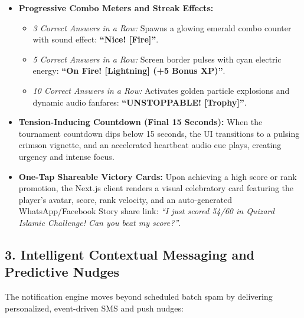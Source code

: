 \begin{itemize}
    \item \textbf{Progressive Combo Meters and Streak Effects:}
    \begin{itemize}
        \item \textit{3 Correct Answers in a Row:} Spawns a glowing emerald combo counter with sound effect: \textbf{``Nice! [Fire]''}.
        \item \textit{5 Correct Answers in a Row:} Screen border pulses with cyan electric energy: \textbf{``On Fire! [Lightning] (+5 Bonus XP)''}.
        \item \textit{10 Correct Answers in a Row:} Activates golden particle explosions and dynamic audio fanfares: \textbf{``UNSTOPPABLE! [Trophy]''}.
    \end{itemize}
    \item \textbf{Tension-Inducing Countdown (Final 15 Seconds):} When the tournament countdown dips below 15 seconds, the UI transitions to a pulsing crimson vignette, and an accelerated heartbeat audio cue plays, creating urgency and intense focus.
    \item \textbf{One-Tap Shareable Victory Cards:} Upon achieving a high score or rank promotion, the Next.js client renders a visual celebratory card featuring the player's avatar, score, rank velocity, and an auto-generated WhatsApp/Facebook Story share link: \textit{``I just scored 54/60 in Quizard Islamic Challenge! Can you beat my score?''}.
\end{itemize}

\subsection{3. Intelligent Contextual Messaging and Predictive Nudges}
The notification engine moves beyond scheduled batch spam by delivering personalized, event-driven SMS and push nudges:

